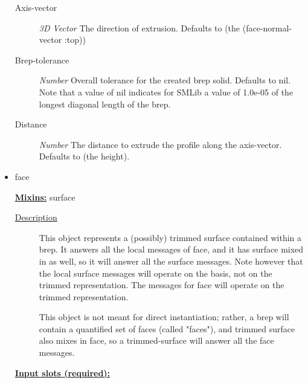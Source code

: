 \documentclass [11pt]{book}
\begin{document}
\begin{itemize}
\begin{description}
\item [Axis-vector]
\emph{3D Vector} The direction of extrusion. Defaults
to (the (face-normal-vector :top))


\item [Brep-tolerance]
\emph{Number} Overall tolerance for the created brep solid. Defaults to nil.
Note that a value of nil indicates for SMLib a value of 1.0e-05 of the longest diagonal
length of the brep.


\item [Distance]
\emph{Number} The distance to extrude the profile along the axis-vector.
Defaults to (the height).


\end{description}







\item {}face


\textbf{
\underline{Mixins:}} surface





\begin{description}

\item [
\underline{Description}]


This object represents a (possibly) trimmed surface contained within a brep. It answers
all the local messages of face, and it has surface mixed in as well, so it will answer all the surface messages. Note 
however that the local surface messages will operate on the basis, not on the trimmed representation. The messages 
for face will operate on the trimmed representation.

This object is not meant for direct instantiation; rather, a brep will contain a quantified set of faces (called "faces"),
and trimmed surface also mixes in face, so a trimmed-surface will answer all the face messages.



\end{description}








\textbf{
\underline{Input slots (required):}}

\begin{description}


\end{description}
\end{itemize}
\end{document}
